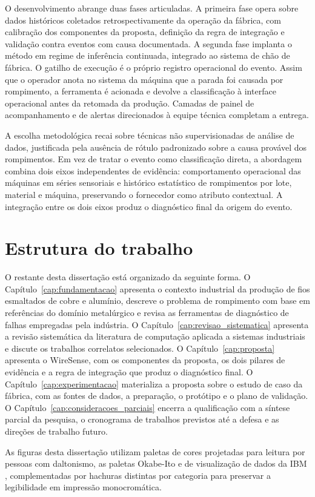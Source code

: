 O desenvolvimento abrange duas fases articuladas. A primeira fase opera sobre dados históricos coletados retrospectivamente da operação da fábrica, com calibração dos componentes da proposta, definição da regra de integração e validação contra eventos com causa documentada. A segunda fase implanta o método em regime de inferência continuada, integrado ao sistema de chão de fábrica. O gatilho de execução é o próprio registro operacional do evento. Assim que o operador anota no sistema da máquina que a parada foi causada por rompimento, a ferramenta é acionada e devolve a classificação à interface operacional antes da retomada da produção. Camadas de painel de acompanhamento e de alertas direcionados à equipe técnica completam a entrega.

A escolha metodológica recai sobre técnicas não supervisionadas de análise de dados, justificada pela ausência de rótulo padronizado sobre a causa provável dos rompimentos. Em vez de tratar o evento como classificação direta, a abordagem combina dois eixos independentes de evidência: comportamento operacional das máquinas em séries sensoriais e histórico estatístico de rompimentos por lote, material e máquina, preservando o fornecedor como atributo contextual. A integração entre os dois eixos produz o diagnóstico final da origem do evento.


\section{Estrutura do trabalho}
\label{sec:estrutura_trabalho}

O restante desta dissertação está organizado da seguinte forma. O Capítulo~\ref{cap:fundamentacao} apresenta o contexto industrial da produção de fios esmaltados de cobre e alumínio, descreve o problema de rompimento com base em referências do domínio metalúrgico e revisa as ferramentas de diagnóstico de falhas empregadas pela indústria. O Capítulo~\ref{cap:revisao_sistematica} apresenta a revisão sistemática da literatura de computação aplicada a sistemas industriais e discute os trabalhos correlatos selecionados. O Capítulo~\ref{cap:proposta} apresenta o WireSense, com os componentes da proposta, os dois pilares de evidência e a regra de integração que produz o diagnóstico final. O Capítulo~\ref{cap:experimentacao} materializa a proposta sobre o estudo de caso da fábrica, com as fontes de dados, a preparação, o protótipo e o plano de validação. O Capítulo~\ref{cap:consideracoes_parciais} encerra a qualificação com a síntese parcial da pesquisa, o cronograma de trabalhos previstos até a defesa e as direções de trabalho futuro.

As figuras desta dissertação utilizam paletas de cores projetadas para leitura por pessoas com daltonismo, as paletas Okabe-Ito \cite{okabeito2008color} e de visualização de dados da IBM \cite{ibm2024datavis}, complementadas por hachuras distintas por categoria para preservar a legibilidade em impressão monocromática.
